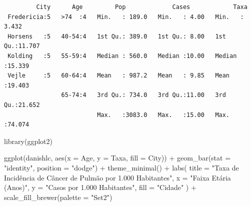 \documentclass[
  letterpaper,
]{article}
\newenvironment{Shaded}{\begin{snugshade}}{\end{snugshade}}
\newcommand{\AttributeTok}[1]{\textcolor[rgb]{0.40,0.45,0.13}{#1}}
\newcommand{\CommentTok}[1]{\textcolor[rgb]{0.37,0.37,0.37}{#1}}
\newcommand{\DecValTok}[1]{\textcolor[rgb]{0.68,0.00,0.00}{#1}}
\newcommand{\FunctionTok}[1]{\textcolor[rgb]{0.28,0.35,0.67}{#1}}
\newcommand{\NormalTok}[1]{\textcolor[rgb]{0.00,0.23,0.31}{#1}}
\newcommand{\OtherTok}[1]{\textcolor[rgb]{0.00,0.23,0.31}{#1}}
\newcommand{\SpecialCharTok}[1]{\textcolor[rgb]{0.37,0.37,0.37}{#1}}
\newcommand{\StringTok}[1]{\textcolor[rgb]{0.13,0.47,0.30}{#1}}
\begin{document}
\begin{Shaded}
\end{Shaded}

\begin{verbatim}
         City      Age         Pop             Cases            Taxa       
 Fredericia:5   >74  :4   Min.   : 189.0   Min.   : 4.00   Min.   : 3.432  
 Horsens   :5   40-54:4   1st Qu.: 389.0   1st Qu.: 8.00   1st Qu.:11.707  
 Kolding   :5   55-59:4   Median : 560.0   Median :10.00   Median :15.339  
 Vejle     :5   60-64:4   Mean   : 987.2   Mean   : 9.85   Mean   :19.403  
                65-74:4   3rd Qu.: 734.0   3rd Qu.:11.00   3rd Qu.:21.652  
                          Max.   :3083.0   Max.   :15.00   Max.   :74.074  
\end{verbatim}

\begin{Shaded}
\begin{Highlighting}[]
\FunctionTok{library}\NormalTok{(ggplot2)}

\FunctionTok{ggplot}\NormalTok{(danishlc, }\FunctionTok{aes}\NormalTok{(}\AttributeTok{x =}\NormalTok{ Age, }\AttributeTok{y =}\NormalTok{ Taxa, }\AttributeTok{fill =}\NormalTok{ City)) }\SpecialCharTok{+}
  \FunctionTok{geom\_bar}\NormalTok{(}\AttributeTok{stat =} \StringTok{"identity"}\NormalTok{, }\AttributeTok{position =} \StringTok{"dodge"}\NormalTok{) }\SpecialCharTok{+}
  \FunctionTok{theme\_minimal}\NormalTok{() }\SpecialCharTok{+}
  \FunctionTok{labs}\NormalTok{(}
    \AttributeTok{title =} \StringTok{"Taxa de Incidência de Câncer de Pulmão por 1.000 Habitantes"}\NormalTok{,}
    \AttributeTok{x =} \StringTok{"Faixa Etária (Anos)"}\NormalTok{,}
    \AttributeTok{y =} \StringTok{"Casos por 1.000 Habitantes"}\NormalTok{,}
    \AttributeTok{fill =} \StringTok{"Cidade"}
\NormalTok{  ) }\SpecialCharTok{+}
  \FunctionTok{scale\_fill\_brewer}\NormalTok{(}\AttributeTok{palette =} \StringTok{"Set2"}\NormalTok{)}
\end{Highlighting}
\end{Shaded}
\end{document}

